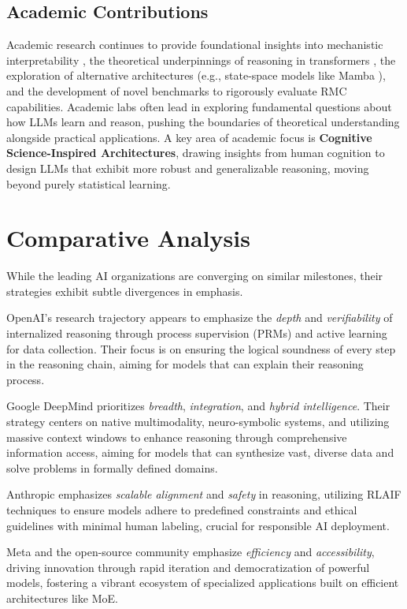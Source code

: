 \documentclass{article}
\begin{document}
\subsection{Academic Contributions}
Academic research continues to provide foundational insights into mechanistic interpretability \cite{olah2020zoom}, the theoretical underpinnings of reasoning in transformers \cite{garg2022what}, the exploration of alternative architectures (e.g., state-space models like Mamba \cite{gu2023mamba}), and the development of novel benchmarks to rigorously evaluate RMC capabilities. Academic labs often lead in exploring fundamental questions about how LLMs learn and reason, pushing the boundaries of theoretical understanding alongside practical applications. A key area of academic focus is \textbf{Cognitive Science-Inspired Architectures}, drawing insights from human cognition to design LLMs that exhibit more robust and generalizable reasoning, moving beyond purely statistical learning.

\section{Comparative Analysis}
While the leading AI organizations are converging on similar milestones, their strategies exhibit subtle divergences in emphasis.

OpenAI's research trajectory appears to emphasize the \textit{depth} and \textit{verifiability} of internalized reasoning through process supervision (PRMs) and active learning for data collection. Their focus is on ensuring the logical soundness of every step in the reasoning chain, aiming for models that can explain their reasoning process.

Google DeepMind prioritizes \textit{breadth}, \textit{integration}, and \textit{hybrid intelligence}. Their strategy centers on native multimodality, neuro-symbolic systems, and utilizing massive context windows to enhance reasoning through comprehensive information access, aiming for models that can synthesize vast, diverse data and solve problems in formally defined domains.

Anthropic emphasizes \textit{scalable alignment} and \textit{safety} in reasoning, utilizing RLAIF techniques to ensure models adhere to predefined constraints and ethical guidelines with minimal human labeling, crucial for responsible AI deployment.

Meta and the open-source community emphasize \textit{efficiency} and \textit{accessibility}, driving innovation through rapid iteration and democratization of powerful models, fostering a vibrant ecosystem of specialized applications built on efficient architectures like MoE.
\end{document}
